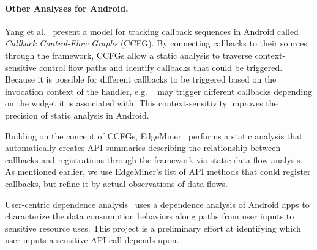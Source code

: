 \paragraph*{Other Analyses for Android.}

Yang et al.~\cite{Yang2015} present a model for tracking callback
sequences in Android called \textit{Callback Control-Flow Graphs}
(CCFG).  By connecting callbacks to their sources through the
framework, CCFGs allow a static analysis to traverse
context-sensitive control flow
paths and identify callbacks that could be triggered.  Because it is 
possible for different callbacks to be triggered based on the invocation 
context of the handler, e.g. ~ may trigger different callbacks
depending on the widget it is associated with.  This context-sensitivity improves
the precision of static analysis in Android.

Building on the concept of CCFGs, EdgeMiner~\cite{cao:2015:edgeminer} performs a
static analysis that automatically creates API summaries describing the
relationship between callbacks and registrations through the framework via static
data-flow analysis.  As mentioned earlier, we use EdgeMiner's list of
API methods that could register callbacks, but refine it by actual observations of
data flows. 

User-centric dependence analysis~\cite{elish2012} uses a dependence analysis
of Android apps to characterize the data consumption behaviors along paths
from user inputs to sensitive resource uses.  This project is a preliminary effort
at identifying which user inputs a sensitive API call depends upon.
%


%



